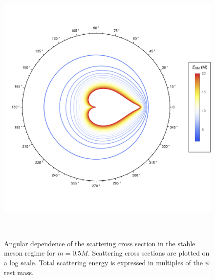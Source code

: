 \documentclass{article}
\begin{document}
\begin{figure}
\begin{center}
\vspace*{-2cm}
\includegraphics[width=14cm, height=14cm]{StableMeson-LowEnergy-Polar}
\caption{Angular dependence of the scattering cross section in the stable meson regime for $m = 0.5 M$. Scattering cross sections are plotted on a log scale. Total scattering energy is expressed in multiples of the $\psi$ rest mass.} 
\label{stable-angular}
\end{center}
\end{figure}
\end{document}
